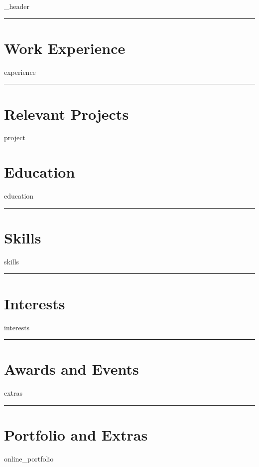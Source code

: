 \documentclass[letter,10pt]{article}
\author{Guilherme Lopes}
\begin{document}
{_header}
\vspace*{10pt}
\hrule
\vspace*{6pt}


\section{\textbf{Work Experience}}
\vspace*{3pt}
{experience}
\vspace*{6pt}
\hrule

\section{\textbf{Relevant Projects}}
\vspace*{3pt}
{project}
\vspace*{32pt}

\section{\textbf{Education}}
\vspace*{3pt}
{education}
\hrule
\vspace*{6pt}

\section{\textbf{Skills}}
\vspace*{3pt}
{skills}
\vspace*{6pt}
\hrule

\section{\textbf{Interests}}
\vspace*{3pt}
{interests}
\vspace*{6pt}
\hrule

\section{\textbf{Awards and Events}}
\vspace*{3pt}
{extras}
\vspace*{6pt}

\hrule
\section{\textbf{Portfolio and Extras}}
\vspace*{6pt}
{online_portfolio}
\end{document}
